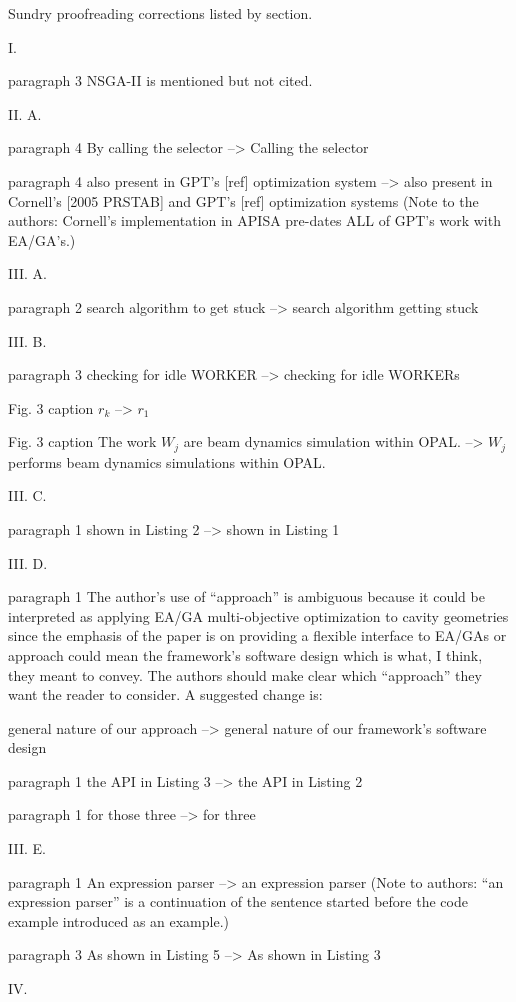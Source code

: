\documentclass{article}
\begin{document}
Sundry proofreading corrections listed by section.

I.

paragraph 3
NSGA-II is mentioned but not cited.

II. A.

paragraph 4
By calling the selector --> Calling the selector

paragraph 4
also present in GPT's [ref] optimization system --> also
present in Cornell's [2005 PRSTAB] and GPT's [ref] optimization
systems
(Note to the authors: Cornell's implementation in APISA pre-dates ALL
of GPT's work with EA/GA's.)

III. A.

paragraph 2
search algorithm to get stuck --> search algorithm getting
stuck

III. B.

paragraph 3
checking for idle WORKER --> checking for idle WORKERs

Fig. 3 caption
$r_k$ --> $r_1$

Fig. 3 caption
The work $W_j$ are beam dynamics simulation within OPAL.
--> $W_j$ performs beam dynamics simulations within OPAL.

III. C.

paragraph 1
shown in Listing 2 --> shown in Listing 1

III. D.

paragraph 1
The author's use of ``approach'' is ambiguous because it could be
interpreted as applying EA/GA multi-objective optimization to cavity
geometries since the emphasis of the paper is on providing a flexible
interface to EA/GAs or approach could mean the framework's software
design which is what, I think, they meant to convey. The authors
should make clear which ``approach'' they want the reader to consider.
A suggested change is:

general nature of our approach --> general nature of our
framework's software design

paragraph 1
the API in Listing 3 --> the API in Listing 2

paragraph 1
for those three --> for three

III. E.

paragraph 1
An expression parser --> an expression parser
(Note to authors: ``an expression parser'' is a continuation of the
sentence started before the code example introduced as an example.)

paragraph 3
As shown in Listing 5 --> As shown in Listing 3

IV.
\end{document}

